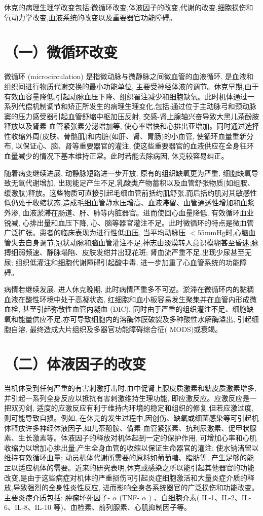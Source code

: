 \documentclass[10pt]{article}
\begin{document}
休克的病理生理学改变包括:微循环改变,体液因子的改变,代谢的改变,细胞损伤和氧动力学改变,血液系统的改变以及重要器官功能障碍。

\section*{（一）微循环改变}
微循环 (microcirculation) 是指微动脉与微静脉之间微血管的血液循环, 是血液和组织间进行物质代谢交换的最小功能单位, 主要受神经体液的调节。休克早期,由于有效血容量降低,引起动脉血压下降、组织䍜注减少和细胞缺氧。此时机体通过一系列代偿机制调节和矫正所发生的病理生理变化,包括:通过位于主动脉弓和颈动脉窦的压力感受器引起血管舒缩中枢加压反射, 交感-肾上腺轴兴奋导致大黑儿茶酚胺释放以及肾素-血管紧张素分泌增加等, 使心率增快和心排出亚增加。同时通过选择性收缩外周(皮肤、骨骼肌)和内脏(如肝、肾、胃肠)的小血管, 使循环血量重新分布, 以保证心、脑、肾等重要器官的灌注, 使这些重要器官的血液供应在全身彺环血量减少的情况下基本维持正常。此时若能去除病因, 休克较容易纠正。

随着病变继续进展, 动静脉短路进一步开放, 原有的组织缺氧更为严重, 细胞缺氧导致无氧代谢增加, 出现能足产生不足,乳酸类产物蓄积以及血管舒张物质(如组胺、缓激肽)释放。这些物质可直接引起毛细血管前括约肌舒张,而后括约肌对其敏感性低仍处于收缩状态,造成毛细血管静水压增高、血液滞留、血管通透性增加和血浆外渗, 血液淤滞在肠道、肝、肺等内脏器官。进而使回心血量降低, 有效循环血业锐减, 心排出量和血压下降, 心、脑等器官灌注不足。此时微循环的特点是微血管广泛扩张。患者的临床表现为进行性低血压, 当平均动脉压 $<55 \mathrm{mmHg}$时,心脑血管失去自身调节,冠状动脉和脑血管灌注不足,神志由淡漠转人意识模糊甚至昏迷;脉搏细弱频速、静脉塌陷、皮肤发绀并出现花斑; 肾血流严重不足,出现少尿甚至无尿; 组织低灌注和细胞代谢障碍引起酸中毒, 进一步加重了心血管系统的功能障碍。

病情若继续发展, 进人休克晚期, 此时病情严重多不可逆。淤滞在微循环内的黏稠血液在酸性环境中处于高凝状态, 红细胞和血小板容易发生聚集并在血管内形成微血栓, 甚至引起弥散性血管内凝血 (DIC), 同时由于严重的组织灌注不足、细胞缺氧和能量供应不足,亦可导致细胞内的溶酶体膜破裂及多种酸性水解酶溢出, 引起细胞自溶, 最终造成大片组织及多器官功能障碍综合征( MODS)或衰竭。

\section*{（二）体液因子的改变}
当机体受到任何严重的有害刺激打击时,血中促肾上腺皮质激素和糖皮质激素增多,并引起一系列全身反应以抵抗有害刺激维持生理功能, 即应激反应。应激反应是一把双刃剑, 适度的应激反应有利于维持内环境的稳定和组织的修复,但若应激过度,则可能导致自损。例如, 在休克的发生过程中,因创伤、缺氧或细菌感染等可引起机体释放许多神经体液因子,如儿茶酚胺、偝素-血管紧张素、抗利尿激素、促甲状腺素、生长激素等。体液因子的释放对机体起到一定的保护作用, 可增加心率和心肌收缩力以增加心排出量;产生全身血管的收缩以保证生命器官的灌注; 使水钠渚留以维持有效循环血量; 动员机体代谢所需要的原料如葡萄糖、脂肪等, 产生足够的能㱏以适应机体的需要。近来的研究表明,休克或感染之所以能引起其他器官的功能改变,是由于这些病症对机体的严重损伤可引起炎症细胞激活和大量炎症介质的释放,导致强烈的全身性炎性反应, 进而影响全身各系统器官的广泛损伤和功能改变。主要炎症介质包括: 肿瘤坏死因子- $\alpha$ (TNF- $\alpha$ ) 、白细胞介素( IL-1、IL-2、IL-6、IL-8、IL-10 等)、血检素、前列腺素、心肌抑制因子等。
\end{document}
